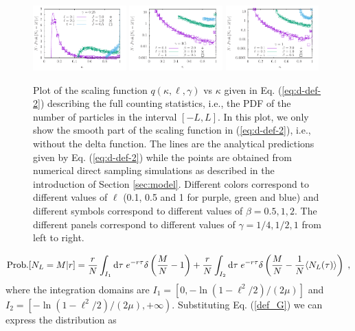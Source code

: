 \documentclass[onecolumn,superscriptaddress,
 amsmath,amssymb,
 aps,
 prd,
]{revtex4-1}
\begin{document}
\begin{figure}[t]
\centering
\includegraphics[width=0.32\textwidth]{fcsG0-25.pdf}
\hfill
\includegraphics[width=0.32\textwidth]{fcsG0-5.pdf}
\hfill
\includegraphics[width=0.32\textwidth]{fcs.pdf}
\caption{Plot of the scaling function $q(\kappa, \ell, \gamma)$ vs $\kappa$ given in Eq. (\ref{eq:d-def-2}) describing the full counting statistics, i.e., the PDF of the number of particles in the interval $[-L, L]$. In this plot, we only show the smooth part of the scaling function in (\ref{eq:d-def-2}), i.e., without the delta function. 
The lines are the analytical predictions given by Eq. (\ref{eq:d-def-2}) while the points are obtained from numerical direct sampling simulations as described in the introduction of Section \ref{sec:model}. Different colors correspond to different values of $\ell$ (0.1, 0.5 and 1 for purple, green and blue) and different symbols correspond to different values of $\beta = 0.5,1,2$. The different panels correspond to different values of $\gamma = 1/4, 1/2, 1$ from left to right.}\label{fig:fcs}
\end{figure}
%
\begin{equation} \label{eq:2-interval-split}
{\rm Prob.}[N_L = M | r] = \frac{r}{N} \int_{I_1} \dd \tau \; e^{-r \tau} \delta\left(\frac{M}{N} - 1\right) + \frac{r}{N} \int_{I_2} \dd \tau \; e^{-r \tau} \delta\left(\frac{M}{N} - \frac{1}{N}\langle N_L(\tau) \rangle\right)  \;,
\end{equation}
where the integration domains are $I_1 = \left[0,-\ln(1-\ell^2/2)/(2 \mu)\right]$ and $I_2 = \left[-\ln(1-\ell^2/2)/(2 \mu),+\infty\right)$. Substituting Eq. (\ref{def_G}) we can express the distribution as 
\end{document}
